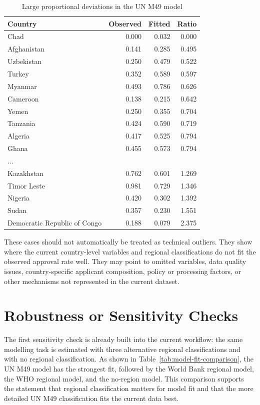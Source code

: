 \documentclass[runningheads]{llncs}
\begin{document}
\begin{table}
\caption{Large proportional deviations in the UN M49 model}
\label{tab:un-m49-large-deviations}
\centering
\renewcommand{\arraystretch}{1.2}
\setlength{\tabcolsep}{6pt}
\begin{tabular}{lrrr}
\hline
Country & Observed & Fitted & Ratio \\
\hline
Chad & 0.000 & 0.032 & 0.000 \\
Afghanistan & 0.141 & 0.285 & 0.495 \\
Uzbekistan & 0.250 & 0.479 & 0.522 \\
Turkey & 0.352 & 0.589 & 0.597 \\
Myanmar & 0.493 & 0.786 & 0.626 \\
Cameroon & 0.138 & 0.215 & 0.642 \\
Yemen & 0.250 & 0.355 & 0.704 \\
Tanzania & 0.424 & 0.590 & 0.719 \\
Algeria & 0.417 & 0.525 & 0.794 \\
Ghana & 0.455 & 0.573 & 0.794 \\
... &  &  &  \\
Kazakhstan & 0.762 & 0.601 & 1.269 \\
Timor Leste & 0.981 & 0.729 & 1.346 \\
Nigeria & 0.420 & 0.302 & 1.392 \\
Sudan & 0.357 & 0.230 & 1.551 \\
Democratic Republic of Congo & 0.188 & 0.079 & 2.375 \\
\hline
\end{tabular}
\end{table}

These cases should not automatically be treated as technical outliers. They show where the current country-level variables and regional classifications do not fit the observed approval rate well. They may point to omitted variables, data quality issues, country-specific applicant composition, policy or processing factors, or other mechanisms not represented in the current dataset.

\section{Robustness or Sensitivity Checks}

The first sensitivity check is already built into the current workflow: the same modelling task is estimated with three alternative regional classifications and with no regional classification. As shown in Table~\ref{tab:model-fit-comparison}, the UN M49 model has the strongest fit, followed by the World Bank regional model, the WHO regional model, and the no-region model. This comparison supports the statement that regional classification matters for model fit and that the more detailed UN M49 classification fits the current data best.
\end{document}

